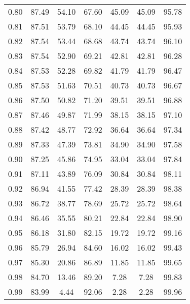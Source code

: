 \begin{tabular}{|c|c|c|c|c|c|c|}
      0.80 &     87.49 &     54.10 &      67.60 &   45.09 &      45.09 &         95.78 \\
      0.81 &     87.51 &     53.79 &      68.10 &   44.45 &      44.45 &         95.93 \\
      0.82 &     87.54 &     53.44 &      68.68 &   43.74 &      43.74 &         96.10 \\
      0.83 &     87.54 &     52.90 &      69.21 &   42.81 &      42.81 &         96.28 \\
      0.84 &     87.53 &     52.28 &      69.82 &   41.79 &      41.79 &         96.47 \\
      0.85 &     87.53 &     51.63 &      70.51 &   40.73 &      40.73 &         96.67 \\
      0.86 &     87.50 &     50.82 &      71.20 &   39.51 &      39.51 &         96.88 \\
      0.87 &     87.46 &     49.87 &      71.99 &   38.15 &      38.15 &         97.10 \\
      0.88 &     87.42 &     48.77 &      72.92 &   36.64 &      36.64 &         97.34 \\
      0.89 &     87.33 &     47.39 &      73.81 &   34.90 &      34.90 &         97.58 \\
      0.90 &     87.25 &     45.86 &      74.95 &   33.04 &      33.04 &         97.84 \\
      0.91 &     87.11 &     43.89 &      76.09 &   30.84 &      30.84 &         98.11 \\
      0.92 &     86.94 &     41.55 &      77.42 &   28.39 &      28.39 &         98.38 \\
      0.93 &     86.72 &     38.77 &      78.69 &   25.72 &      25.72 &         98.64 \\
      0.94 &     86.46 &     35.55 &      80.21 &   22.84 &      22.84 &         98.90 \\
      0.95 &     86.18 &     31.80 &      82.15 &   19.72 &      19.72 &         99.16 \\
      0.96 &     85.79 &     26.94 &      84.60 &   16.02 &      16.02 &         99.43 \\
      0.97 &     85.30 &     20.86 &      86.89 &   11.85 &      11.85 &         99.65 \\
      0.98 &     84.70 &     13.46 &      89.20 &    7.28 &       7.28 &         99.83 \\
      0.99 &     83.99 &      4.44 &      92.06 &    2.28 &       2.28 &         99.96 \\
\bottomrule
\end{tabular}
